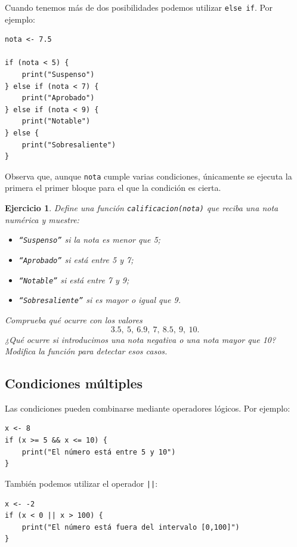 \documentclass[11pt,a4paper]{article}
\theoremstyle{exercise}
\newtheorem{exercise}{Ejercicio}
\begin{document}
Cuando tenemos más de dos posibilidades podemos utilizar \texttt{else if}. Por ejemplo:

\begin{lstlisting}[style=rstyle]
nota <- 7.5

if (nota < 5) {
  	print("Suspenso")
} else if (nota < 7) {
  	print("Aprobado")
} else if (nota < 9) {
  	print("Notable")
} else {
  	print("Sobresaliente")
}
\end{lstlisting}

Observa que, aunque \texttt{nota} cumple varias condiciones, únicamente se ejecuta la primera el primer bloque para el que la condición es cierta.


\begin{exercise}
Define una función \texttt{calificacion(nota)} que reciba una nota numérica y muestre:

\begin{itemize}[leftmargin=*]
	\item \texttt{``Suspenso''} si la nota es menor que 5;
	\item \texttt{``Aprobado''} si está entre 5 y 7;
	\item \texttt{``Notable''} si está entre 7 y 9;
	\item \texttt{``Sobresaliente''} si es mayor o igual que 9.
\end{itemize}

\noindent Comprueba qué ocurre con los valores 
\[ 3.5,\ 5,\ 6.9,\ 7,\ 8.5,\ 9,\ 10. \]
 ¿Qué ocurre si introducimos una nota negativa o una nota mayor que 10? Modifica la función para detectar esos casos.
\end{exercise}

\subsection{Condiciones múltiples}

Las condiciones pueden combinarse mediante operadores lógicos. Por ejemplo:

\begin{lstlisting}[style=rstyle]
x <- 8
if (x >= 5 && x <= 10) {
	print("El número está entre 5 y 10")
}
\end{lstlisting}

\noindent También podemos utilizar el operador \texttt{||}:

\begin{lstlisting}[style=rstyle]
x <- -2
if (x < 0 || x > 100) {
	print("El número está fuera del intervalo [0,100]")
}
\end{lstlisting}
\end{document}

